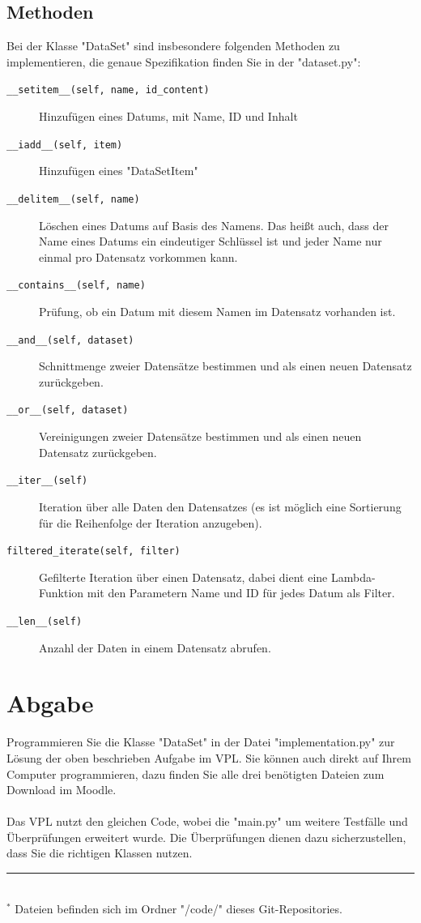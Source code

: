 \documentclass[]{article}
\begin{document}
\subsection{Methoden}
Bei der Klasse "DataSet" sind insbesondere folgenden Methoden zu implementieren, die genaue Spezifikation finden Sie in der "dataset.py":\\
\begin{description}
	\item[\texttt{\_\_setitem\_\_(self, name, id\_content)}] Hinzufügen eines Datums, mit Name, ID und Inhalt
	\item[\texttt{\_\_iadd\_\_(self, item)}] Hinzufügen eines "DataSetItem"
	\item[\texttt{\_\_delitem\_\_(self, name)}] Löschen eines Datums auf Basis des Namens. Das heißt auch, dass der Name eines Datums ein eindeutiger Schlüssel ist und jeder Name nur einmal pro Datensatz vorkommen kann.
	\item[\texttt{\_\_contains\_\_(self, name)}] Prüfung, ob ein Datum mit diesem Namen im Datensatz vorhanden ist.
	\item[\texttt{\_\_and\_\_(self, dataset)}] Schnittmenge zweier Datensätze bestimmen und als einen neuen Datensatz zurückgeben.
	\item[\texttt{\_\_or\_\_(self, dataset)}] Vereinigungen zweier Datensätze bestimmen und als einen neuen Datensatz zurückgeben.
	\item[\texttt{\_\_iter\_\_(self)}] Iteration über alle Daten den Datensatzes (es ist möglich eine Sortierung für die Reihenfolge der Iteration anzugeben).
	\item[\texttt{filtered\_iterate(self, filter)}] Gefilterte Iteration über einen Datensatz, dabei dient eine Lambda-Funktion mit den Parametern Name und ID für jedes Datum als Filter.
	\item[\texttt{\_\_len\_\_(self)}] Anzahl der Daten in einem Datensatz abrufen.
\end{description}
\section{Abgabe}
Programmieren Sie die Klasse "DataSet" in der Datei "implementation.py" zur Lösung der oben beschrieben Aufgabe im VPL.
Sie können auch direkt auf Ihrem Computer programmieren, dazu finden Sie alle drei benötigten Dateien zum Download im Moodle.\\
\\
Das VPL nutzt den gleichen Code, wobei die "main.py" um weitere Testfälle und Überprüfungen erweitert wurde.
Die Überprüfungen dienen dazu sicherzustellen, dass Sie die richtigen Klassen nutzen.\\
%
\hrule\hfill\\[0.2cm]
$^*$ Dateien befinden sich im Ordner "/code/" dieses Git-Repositories.\\
\end{document}
